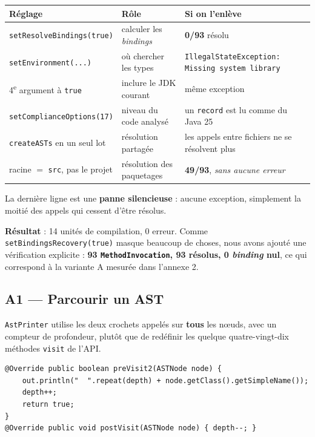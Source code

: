 \documentclass[11pt,a4paper]{article}
\begin{document}
\begin{table}[H]
\centering\small
\begin{tabular}{@{}p{4.3cm}p{4.1cm}p{6cm}@{}}
\toprule
\textbf{Réglage} & \textbf{Rôle} & \textbf{Si on l'enlève} \\
\midrule
\texttt{setResolveBindings(true)} & calculer les \textit{bindings} & \textbf{0/93} résolu \\
\texttt{setEnvironment(...)} & où chercher les types & \texttt{IllegalStateException: Missing system library} \\
4\textsuperscript{e} argument à \texttt{true} & inclure le JDK courant & même exception \\
\texttt{setComplianceOptions(17)} & niveau du code analysé & un \texttt{record} est lu comme du Java 25 \\
\texttt{createASTs} en un seul lot & résolution partagée & les appels entre fichiers ne se résolvent plus \\
racine $=$ \texttt{src}, pas le projet & résolution des paquetages & \textbf{49/93}, \textit{sans aucune erreur} \\
\bottomrule
\end{tabular}
\end{table}

La dernière ligne est une \textbf{panne silencieuse} : aucune exception, simplement la moitié des appels qui cessent d'être résolus.

\textbf{Résultat} : 14 unités de compilation, 0 erreur. Comme \texttt{setBindingsRecovery(true)} masque beaucoup de choses, nous avons ajouté une vérification explicite : \textbf{93 \texttt{MethodInvocation}, 93 résolus, 0 \textit{binding} nul}, ce qui correspond à la variante A mesurée dans l'annexe 2.

\subsection{A1 --- Parcourir un AST}

\texttt{AstPrinter} utilise les deux crochets appelés sur \textbf{tous} les n\oe{}uds, avec un compteur de profondeur, plutôt que de redéfinir les quelque quatre-vingt-dix méthodes \texttt{visit} de l'API.

\begin{lstlisting}
@Override public boolean preVisit2(ASTNode node) {
    out.println("  ".repeat(depth) + node.getClass().getSimpleName());
    depth++;
    return true;
}
@Override public void postVisit(ASTNode node) { depth--; }
\end{lstlisting}
\end{document}
